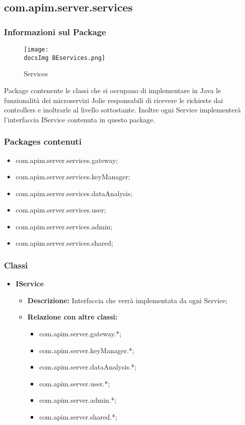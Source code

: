 {  \subsection{com.apim.server.services}{
    \subsubsection{Informazioni sul Package}
     \begin{figure}[ht]
       \centering
       \texttt{[image: \\docsImg BEservices.png]}
       \caption{Services}
       \label{Services}
     \end{figure}
     Package contenente le classi che si occupano di implementare in Java le funzionalità dei microservizi Jolie responsabili di ricevere le richieste dai controllers e inoltrarle al livello sottostante. Inoltre ogni Service implementerà l'interfaccia IService contenuta in questo package.
     \subsubsection{Packages contenuti}
     \begin{itemize}
       \item com.apim.server.services.gateway;
       \item com.apim.server.services.keyManager;
       \item com.apim.server.services.dataAnalysis;
       \item com.apim.server.services.user;
       \item com.apim.server.services.admin;
       \item com.apim.server.services.shared;
     \end{itemize}
     \subsubsection{Classi}
     \begin{itemize} \itemsep1pt
       \item \textbf{IService}
       \begin{itemize}
         \item \textbf{Descrizione:} Interfaccia che verrà implementata da ogni Service;
         \item \textbf{Relazione con altre classi:}
         \begin{itemize}
           \item com.apim.server.gateway.*;
           \item com.apim.server.keyManager.*;
           \item com.apim.server.dataAnalysis.*;
           \item com.apim.server.user.*;
           \item com.apim.server.admin.*;
           \item com.apim.server.shared.*;
         \end{itemize}
       \end{itemize}
     \end{itemize}
}}
